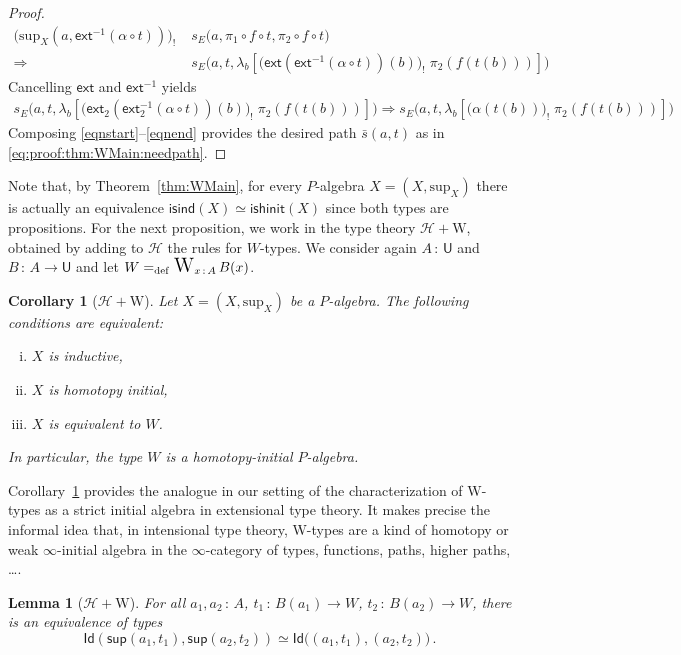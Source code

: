 \documentclass[10pt,a4paper,oneside,reqno]{amsart}
\theoremstyle{mythm}
\newtheorem{lemma}[theorem]{Lemma}
\newtheorem{corollary}[theorem]{Corollary}
\theoremstyle{mydef}
\theoremstyle{myrmk}
\newcommand{\defeq}{=_{\mathrm{def}}}
\newcommand{\co}{\,{:}\,}
\newcommand{\Hint}{\mathcal{H}}
\newcommand{\isalgind}{\mathsf{isind}}
\newcommand{\isalghinit}{\mathsf{ishinit}}
\newcommand{\ext}{\mathsf{ext}}
\newcommand{\Id}{\mathsf{Id}}
\newcommand{\lam}[1]{\lambda_{#1}}
\newcommand{\W}{\mathrm{W}}
\DeclareMathOperator*{\WW}{\text{\Large $\mathrm{W}$}}
\newcommand{\wsup}{\mathsf{sup}}
\newcommand{\U}{\mathsf{U}}
\renewcommand{\sup}{\mathrm{sup}}
\begin{document}
\begin{proof}
\begin{align*}
\big(\sup_X(a,\ext^{-1}(\alpha \circ t))\big)_{!} \; &s_E\big(a,\pi_1 \circ f \circ t, \pi_2 \circ f \circ t\big)\\
\Rightarrow\ & s_E\big(a,t, \lam{b}[ \big(\ext(\ext^{-1}(\alpha \circ t))(b)\big)_{!} \; \pi_2(f(t(b)))]\big)
\end{align*}
Cancelling $\ext$ and $\ext^{-1}$  yields
\begin{align}
s_E\big(a,t, \lam{b}[ \big(\ext_2(\ext^{-1}_2(\alpha \circ t))(b)\big)_{!} \; \pi_2(f(t(b)))]\big) \Rightarrow s_E\big(a,t, \lam{b}[ \big(\alpha(t(b))\big)_{!} \; \pi_2(f(t(b)))]\big)
 \label{eqnend}
\end{align}
Composing \eqref{eqnstart}--\eqref{eqnend} provides the desired path $\bar{s}(a,t)$ as in \eqref{eq:proof:thm:WMain:needpath}.
\end{proof}



Note that, by Theorem~\ref{thm:WMain}, for every $P$-algebra $X = (X, \sup_X)$ there is actually an equivalence $\isalgind(X) \simeq \isalghinit(X)$ since both types are propositions.  For the next proposition, we work in the type theory $\Hint + \W$, obtained by adding to $\Hint$ the rules for $W$-types.
We consider again $A \co \U$ and $B \co A \to \U$ and let $W \defeq \WW_{x \co A} B(x)$.

\begin{corollary}[$\Hint + \W$]
\label{lem:WInitInt} Let $X = (X, \sup_X)$ be a $P$-algebra. The following conditions are
equivalent:
\begin{enumerate}[(i)]
\item $X$ is inductive,
\item $X$ is homotopy initial,
\item $X$ is equivalent to $W$.
\end{enumerate}
In particular, the type $W$ is a homotopy-initial $P$-algebra.
\end{corollary}


Corollary~\ref{lem:WInitInt} provides the analogue in our setting of the characterization of W-types as a strict initial algebra in extensional type theory. It makes precise the informal idea that, in intensional type theory, W-types are a kind of homotopy or weak $\infty$-initial algebra in the $\infty$-category of types, functions, paths, higher paths, \ldots.  

\begin{lemma}[$\Hint + \W$]\label{lem:suppath}
For all $a_1,a_2 \co A$, $t_1 \co B(a_1) \to W$, $t_2 \co B(a_2) \to W$, there is an equivalence of types
\[ 
\Id ( \wsup(a_1,t_1),  \wsup(a_2,t_2)  ) \simeq  \Id \big( (a_1,t_1), (a_2,t_2) \big) \, . 
\]
\end{lemma}
\end{document}
